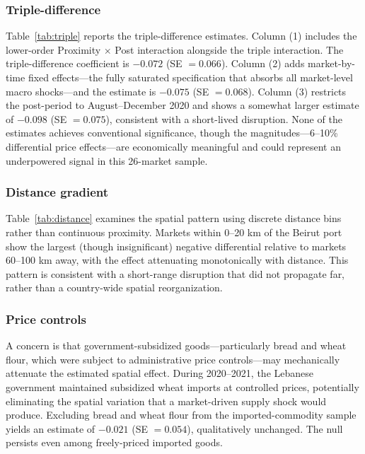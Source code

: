 \documentclass[12pt]{article}
\begin{document}
\subsubsection*{Triple-difference} Table~\ref{tab:triple} reports the triple-difference estimates. Column (1) includes the lower-order Proximity $\times$ Post interaction alongside the triple interaction. The triple-difference coefficient is $-0.072$ (SE $= 0.066$). Column (2) adds market-by-time fixed effects---the fully saturated specification that absorbs all market-level macro shocks---and the estimate is $-0.075$ (SE $= 0.068$). Column (3) restricts the post-period to August--December 2020 and shows a somewhat larger estimate of $-0.098$ (SE $= 0.075$), consistent with a short-lived disruption. None of the estimates achieves conventional significance, though the magnitudes---6--10\% differential price effects---are economically meaningful and could represent an underpowered signal in this 26-market sample.

{\small}

\subsubsection*{Distance gradient} Table~\ref{tab:distance} examines the spatial pattern using discrete distance bins rather than continuous proximity. Markets within 0--20 km of the Beirut port show the largest (though insignificant) negative differential relative to markets 60--100 km away, with the effect attenuating monotonically with distance. This pattern is consistent with a short-range disruption that did not propagate far, rather than a country-wide spatial reorganization.

{\small}

\subsubsection*{Price controls} A concern is that government-subsidized goods---particularly bread and wheat flour, which were subject to administrative price controls---may mechanically attenuate the estimated spatial effect. During 2020--2021, the Lebanese government maintained subsidized wheat imports at controlled prices, potentially eliminating the spatial variation that a market-driven supply shock would produce. Excluding bread and wheat flour from the imported-commodity sample yields an estimate of $-0.021$ (SE $= 0.054$), qualitatively unchanged. The null persists even among freely-priced imported goods.
\end{document}
